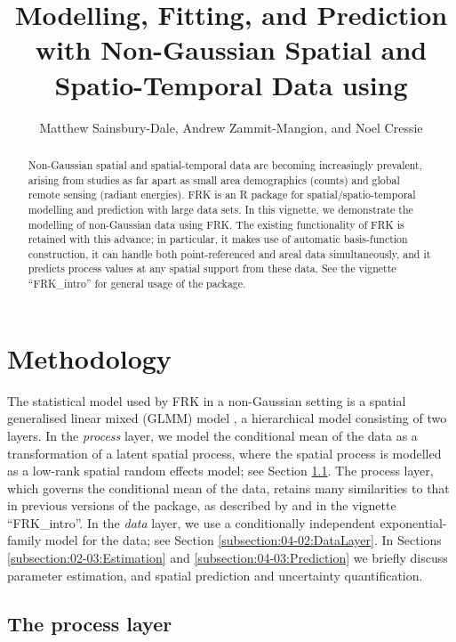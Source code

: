 \documentclass{article}\usepackage[]{graphicx}\usepackage[]{color}
\author{Matthew Sainsbury-Dale, Andrew Zammit-Mangion, and Noel Cressie}
\title{Modelling, Fitting, and Prediction with Non-Gaussian Spatial and Spatio-Temporal Data using \pkg{FRK}}
\newcommand{\pkg}[1]{{\fontseries{b}\selectfont #1}}
\let\proglang=\textsf
\begin{document}
\maketitle

\begin{abstract}
 Non-Gaussian spatial and spatial-temporal data are becoming increasingly prevalent, arising from studies as far apart as small area demographics (counts) and global remote sensing (radiant energies). 
  \pkg{FRK} is an \proglang{R} package for spatial/spatio-temporal modelling and prediction with large data sets. 
In this vignette, we demonstrate the modelling of non-Gaussian data  using \pkg{FRK}. 
The existing functionality of \pkg{FRK} is retained with this advance; in particular, it makes use of automatic basis-function construction, it can handle both point-referenced and areal data simultaneously, and it predicts process values at any spatial support from these data. See the vignette ``FRK\_intro'' for general usage of the package. 
\end{abstract}



\tableofcontents 

\section{Methodology}\label{SEC:Methodology}

The statistical model used by \pkg{FRK} in a non-Gaussian setting is a spatial generalised linear mixed (GLMM) model \citep{Diggle_1998_spatial_GLMM}, a hierarchical model consisting of two layers.
 In the \textit{process} layer, we model the conditional mean of the data as a transformation of a latent spatial process, where the spatial process is modelled as a low-rank spatial random effects model; see Section  \ref{subsection:04-01:ProcessLayer}. 
 The process layer, which governs the conditional mean of the data, retains many similarities to that in previous versions of the package, as described by \cite{FRK_paper} and in the vignette ``FRK\_intro''. 
 In the \textit{data} layer, we use a conditionally independent exponential-family model for the data; see Section \ref{subsection:04-02:DataLayer}. 
In Sections \ref{subsection:02-03:Estimation} and \ref{subsection:04-03:Prediction} we briefly discuss parameter estimation, and spatial prediction and uncertainty quantification.

\subsection{The process layer}\label{subsection:04-01:ProcessLayer}
\end{document}
